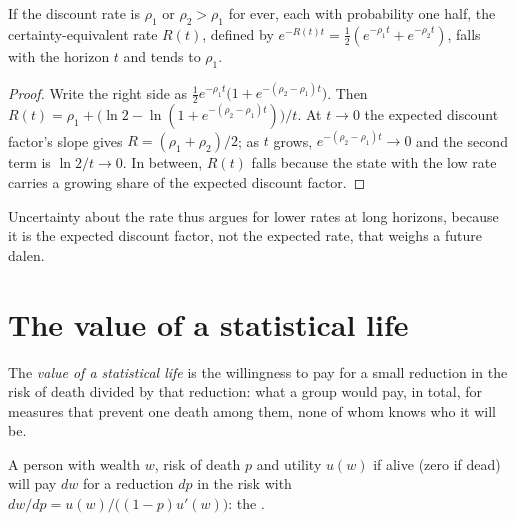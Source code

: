 \begin{proposition}\label{prop:b3:cost-benefit-analysis:weitzman}
If the discount rate is $\rho_1$ or $\rho_2 > \rho_1$ for ever, each with probability one half, the
certainty-equivalent rate $R(t)$, defined by $e^{-R(t)t} = \tfrac12(e^{-\rho_1t} + e^{-\rho_2t})$, falls with the horizon
$t$ and tends to $\rho_1$.
\end{proposition}

\begin{proof}
Write the right side as $\tfrac12e^{-\rho_1t}\big(1 + e^{-(\rho_2 - \rho_1)t}\big)$. Then $R(t) = \rho_1 + \big(\ln 2 - \ln(1 + e^{-(\rho_2 - \rho_1)t})\big)/t$. At $t \to 0$ the
expected discount factor's slope gives $R = (\rho_1 + \rho_2)/2$; as $t$ grows, $e^{-(\rho_2 - \rho_1)t} \to 0$ and the second
term is $\ln 2/t \to 0$. In between, $R(t)$ falls because the state with the low rate carries a
growing share of the expected discount factor.
\end{proof}

Uncertainty about the rate thus argues for lower rates at long horizons, because
it is the expected discount factor, not the expected rate, that weighs a future
dalen.

\section{The value of a statistical life}\label{sec:b3:cost-benefit-analysis:vsl}

\begin{definition}\label{def:b3:cost-benefit-analysis:vsl}
The \emph{value of a statistical life} is the willingness to pay for a small reduction
in the risk of death divided by that reduction: what a group would pay, in total,
for measures that prevent one death among them, none of whom knows who it will be.
\end{definition}

\begin{proposition}\label{prop:b3:cost-benefit-analysis:vsl}
A person with wealth $w$, risk of death $p$ and utility $u(w)$ if alive (zero if dead)
will pay $dw$ for a reduction $dp$ in the risk with $dw/dp = u(w)/\big((1 - p)u'(w)\big)$: the .
\end{proposition}

